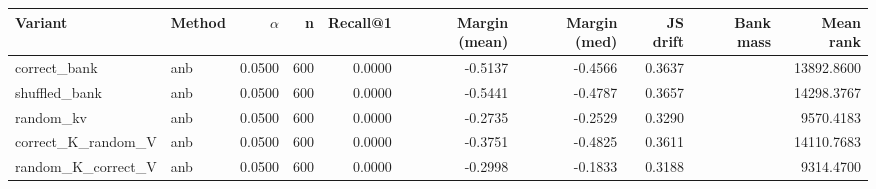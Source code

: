 \begin{tabular}{l l r r r r r r r r}
\toprule
Variant & Method & $\alpha$ & n & Recall@1 & Margin (mean) & Margin (med) & JS drift & Bank mass & Mean rank \\
\midrule
correct\_bank & anb & 0.0500 & 600 & 0.0000 & -0.5137 & -0.4566 & 0.3637 &  & 13892.8600 \\
shuffled\_bank & anb & 0.0500 & 600 & 0.0000 & -0.5441 & -0.4787 & 0.3657 &  & 14298.3767 \\
random\_kv & anb & 0.0500 & 600 & 0.0000 & -0.2735 & -0.2529 & 0.3290 &  & 9570.4183 \\
correct\_K\_random\_V & anb & 0.0500 & 600 & 0.0000 & -0.3751 & -0.4825 & 0.3611 &  & 14110.7683 \\
random\_K\_correct\_V & anb & 0.0500 & 600 & 0.0000 & -0.2998 & -0.1833 & 0.3188 &  & 9314.4700 \\
\bottomrule
\end{tabular}
